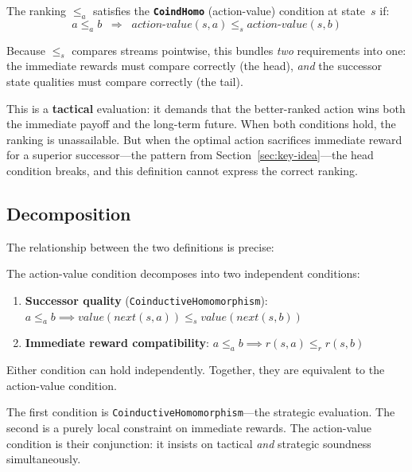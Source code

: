 \documentclass[runningheads]{llncs}
\begin{document}
\begin{definition}\label{def:coindhomo}
The ranking $\le_a$ satisfies the \textbf{\texttt{CoindHomo}} (action-value) condition at state~$s$ if:
\[
a \le_a b \;\;\Longrightarrow\;\; \mathit{action\text{-}value}(s,a) \le_s \mathit{action\text{-}value}(s,b)
\]
\end{definition}

\noindent Because $\le_s$ compares streams pointwise, this bundles \emph{two} requirements into one: the immediate rewards must compare correctly (the head), \emph{and} the successor state qualities must compare correctly (the tail).

This is a \textbf{tactical} evaluation: it demands that the better-ranked action wins both the immediate payoff and the long-term future.  When both conditions hold, the ranking is unassailable.  But when the optimal action sacrifices immediate reward for a superior successor---the pattern from Section~\ref{sec:key-idea}---the head condition breaks, and this definition cannot express the correct ranking.

\subsection{Decomposition}

The relationship between the two definitions is precise:

\begin{theorem}[Decomposition]\label{thm:decomposition}
The action-value condition decomposes into two independent conditions:
\begin{enumerate}
\item \textbf{Successor quality} (\texttt{CoinductiveHomomorphism}): $a \le_a b \implies \mathit{value}(\mathit{next}(s,a)) \le_s \mathit{value}(\mathit{next}(s,b))$
\item \textbf{Immediate reward compatibility}: $a \le_a b \implies r(s,a) \le_r r(s,b)$
\end{enumerate}
Either condition can hold independently.  Together, they are equivalent to the action-value condition.
\end{theorem}

The first condition is \texttt{CoinductiveHomomorphism}---the strategic evaluation.
The second is a purely local constraint on immediate rewards.
The action-value condition is their conjunction: it insists on tactical \emph{and} strategic soundness simultaneously.
\end{document}
